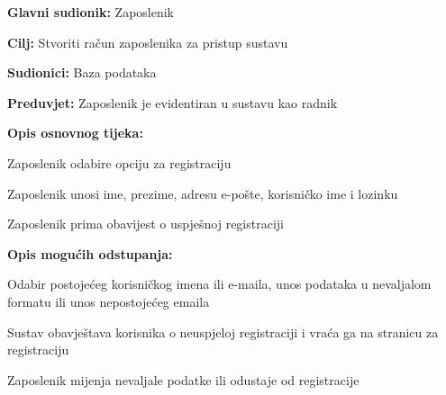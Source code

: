 				\noindent {}
				\begin{packed_item}
					
					\item \textbf{Glavni sudionik: }Zaposlenik
					\item  \textbf{Cilj:} Stvoriti račun zaposlenika za pristup sustavu
					\item  \textbf{Sudionici:} Baza podataka
					\item  \textbf{Preduvjet:} Zaposlenik je evidentiran u sustavu kao radnik
					\item  \textbf{Opis osnovnog tijeka:}
					
					\item[] \begin{packed_enum}
						
						\item Zaposlenik odabire opciju za registraciju
						\item Zaposlenik unosi ime, prezime, adresu e-pošte, korisničko ime i lozinku
						\item Zaposlenik prima obavijest o uspješnoj registraciji
					\end{packed_enum}
					
					\item  \textbf{Opis mogućih odstupanja:}
					
					\item[] \begin{packed_item}
						
						\item[2.a] Odabir postojećeg korisničkog imena ili e-maila, unos podataka u nevaljalom formatu ili unos nepostojećeg emaila
						\item[] \begin{packed_enum}
							
							\item Sustav obavještava korisnika o neuspjeloj registraciji i vraća ga na stranicu za registraciju
							\item Zaposlenik mijenja nevaljale podatke ili odustaje od registracije
							
						\end{packed_enum}
						
						
					\end{packed_item}
				\end{packed_item}
			
